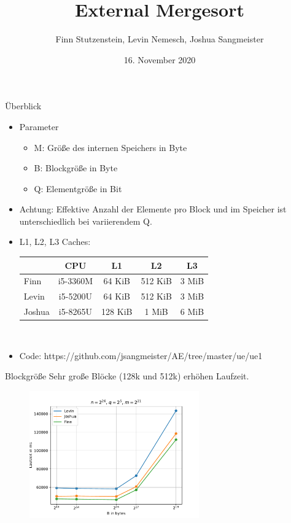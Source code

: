 \documentclass[ngerman,aspectratio=169,10pt]{beamer}
\title{External Mergesort}
\date{16. November 2020}
\author{Finn Stutzenstein, Levin Nemesch, Joshua Sangmeister}
\institute{Algorithm Engineering - Übung 1}
\begin{document}
	
\maketitle

\begin{frame}{Überblick}
\begin{itemize}
    \item Parameter
    \begin{itemize}
        \item M: Größe des internen Speichers in Byte
        \item B: Blockgröße in Byte
        \item Q: Elementgröße in Bit
    \end{itemize}
    \item Achtung: Effektive Anzahl der Elemente pro Block und im Speicher ist unterschiedlich bei variierendem Q.
    \item L1, L2, L3 Caches:\\[10pt]
    \begin{tabular}{ |l|c|c|c|c| } 
    \hline
     & CPU & L1 & L2 & L3 \\
     \hline
     Finn & i5-3360M & 64 KiB & 512 KiB & 3 MiB \\
     Levin & i5-5200U & 64 KiB & 512 KiB & 3 MiB \\
     Joshua & i5-8265U & 128 KiB & 1 MiB & 6 MiB \\
    \hline
    \end{tabular} \\[10pt]
    \item Code: https://github.com/jsangmeister/AE/tree/master/ue/ue1
\end{itemize}
\end{frame}

\begin{frame}{Blockgröße}
Sehr große Blöcke (128k und 512k) erhöhen Laufzeit.
\begin{figure}[H]
    \centering
    \includegraphics[width=0.65\textwidth]{b__n_67108864_q_32_m_2097152.pdf}
    \label{fig:Figure2}
\end{figure}
\end{frame}
\end{document}
